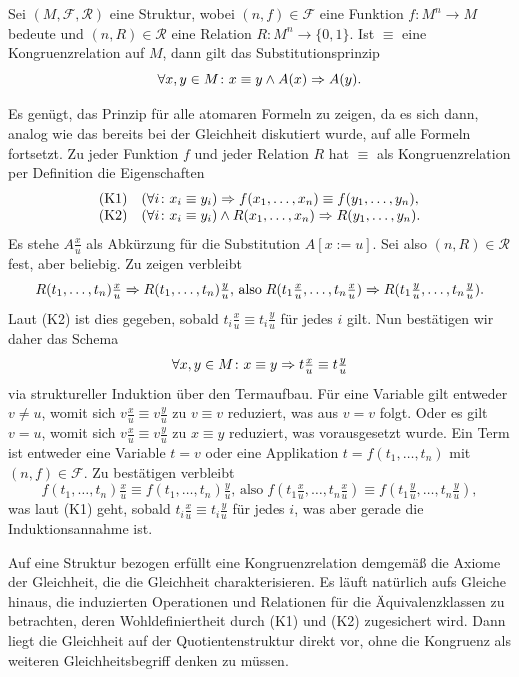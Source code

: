\begin{Satz}
Sei $(M,\mathcal F,\mathcal R)$ eine Struktur, wobei $(n,f)\in\mathcal F$
eine Funktion $f\colon M^n\to M$ bedeute und $(n,R)\in\mathcal R$ eine
Relation $R\colon M^n\to\{0,1\}$. Ist $\equiv$ eine
Kongruenzrelation auf $M$, dann gilt das Substitutionsprinzip
\[\forall x,y\in M\colon x\equiv y\land A(x)\Rightarrow A(y).\]
\end{Satz}
\begin{Beweis}
Es genügt, das Prinzip für alle atomaren Formeln zu zeigen, da es sich
dann, analog wie das bereits bei der Gleichheit diskutiert wurde, auf
alle Formeln fortsetzt. Zu jeder Funktion $f$ und jeder Relation $R$
hat $\equiv$ als Kongruenzrelation per Definition die Eigenschaften
\[\begin{array}{ll}
\text{(K1)} & (\forall i\colon x_i\equiv y_i)\Rightarrow f(x_1,\ldots,x_n)\equiv f(y_1,\ldots, y_n),\\
\text{(K2)} & (\forall i\colon x_i\equiv y_i)\land R(x_1,\ldots,x_n)\Rightarrow R(y_1,\ldots, y_n).
\end{array}\]
Es stehe $A\tfrac{x}{u}$ als Abkürzung für die Substitution $A[x:=u]$.
Sei also $(n,R)\in\mathcal R$ fest, aber beliebig. Zu zeigen verbleibt
\[R(t_1,\ldots,t_n)\tfrac{x}{u}\Rightarrow R(t_1,\ldots,t_n)\tfrac{y}{u},\,
\text{also}\;R(t_1\tfrac{x}{u},\ldots,t_n\tfrac{x}{u})\Rightarrow R(t_1\tfrac{y}{u},\ldots,t_n\tfrac{y}{u}).\]
Laut (K2) ist dies gegeben, sobald $t_i\tfrac{x}{u}\equiv t_i\tfrac{y}{u}$
für jedes $i$ gilt. Nun bestätigen wir daher das Schema
\[\forall x,y\in M\colon x\equiv y\Rightarrow t\tfrac{x}{u}\equiv t\tfrac{y}{u}\]
via struktureller Induktion über den Termaufbau. Für eine Variable
gilt entweder $v\ne u$, womit sich $v\tfrac{x}{u}\equiv v\tfrac{y}{u}$
zu $v\equiv v$ reduziert, was aus $v=v$ folgt. Oder es gilt $v=u$, womit
sich $v\tfrac{x}{u}\equiv v\tfrac{y}{u}$ zu $x\equiv y$ reduziert, was
vorausgesetzt wurde. Ein Term ist entweder eine Variable $t=v$ oder eine
Applikation $t=f(t_1,\ldots,t_n)$ mit $(n,f)\in\mathcal F$. Zu bestätigen verbleibt
\[f(t_1,\ldots,t_n)\tfrac{x}{u}\equiv f(t_1,\ldots,t_n)\tfrac{y}{u},\,
\text{also}\;f(t_1\tfrac{x}{u},\ldots,t_n\tfrac{x}{u})\equiv f(t_1\tfrac{y}{u},\ldots,t_n\tfrac{y}{u}),\]
was laut (K1) geht, sobald $t_i\tfrac{x}{u}\equiv t_i\tfrac{y}{u}$
für jedes $i$, was aber gerade die Induktionsannahme ist.\,\qedsymbol
\end{Beweis}

\noindent
Auf eine Struktur bezogen erfüllt eine Kongruenzrelation demgemäß die
Axiome der Gleichheit, die die Gleichheit charakterisieren. Es läuft
natürlich aufs Gleiche hinaus, die induzierten Operationen und Relationen
für die Äquivalenzklassen zu betrachten, deren Wohldefiniertheit durch
(K1) und (K2) zugesichert wird. Dann liegt die Gleichheit auf der
Quotientenstruktur direkt vor, ohne die Kongruenz als weiteren
Gleichheitsbegriff denken zu müssen.

